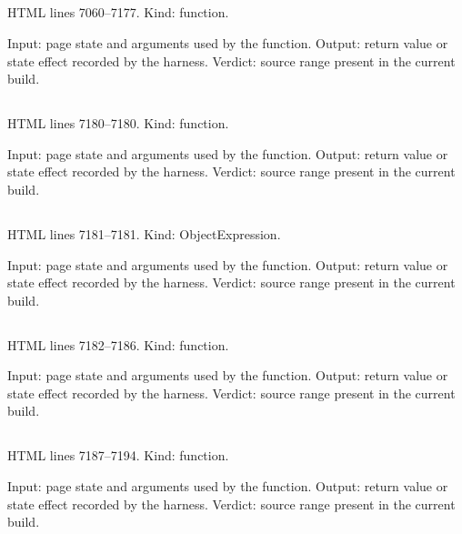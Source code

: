 \subsection*{\texttt{}}
\label{vf_352_mgBuildQueue}
HTML lines 7060--7177. Kind: function.

Input: page state and arguments used by the function.
Output: return value or state effect recorded by the harness.
Verdict: source range present in the current build.

\subsection*{\texttt{}}
\label{vf_353_mgItem}
HTML lines 7180--7180. Kind: function.

Input: page state and arguments used by the function.
Output: return value or state effect recorded by the harness.
Verdict: source range present in the current build.

\subsection*{\texttt{}}
\label{vf_354_MG_TYPE_LABEL}
HTML lines 7181--7181. Kind: ObjectExpression.

Input: page state and arguments used by the function.
Output: return value or state effect recorded by the harness.
Verdict: source range present in the current build.

\subsection*{\texttt{}}
\label{vf_355_mgChartTypeOptions}
HTML lines 7182--7186. Kind: function.

Input: page state and arguments used by the function.
Output: return value or state effect recorded by the harness.
Verdict: source range present in the current build.

\subsection*{\texttt{}}
\label{vf_356_mgChartAxisOptions}
HTML lines 7187--7194. Kind: function.

Input: page state and arguments used by the function.
Output: return value or state effect recorded by the harness.
Verdict: source range present in the current build.

